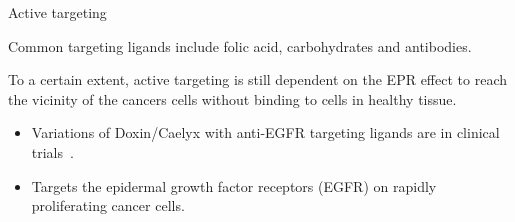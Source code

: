 \documentclass[final]{beamer}
\begin{document}
\begin{frame}[plain]
\begin{columns}[t,onlytextwidth]
\begin{block}{Active targeting\strut}
        Common targeting ligands include \alert{folic acid}, \alert{carbohydrates} and \alert{antibodies}.

        To a certain extent, active targeting is still dependent on the \alert{EPR effect} to reach the vicinity of the cancers cells without binding to cells in healthy tissue.

        \vspace{4ex}
        \begin{example}
          \begin{itemize}
            \item Variations of \alert{Doxin\textsuperscript{\textregistered}/Caelyx\textsuperscript{\textregistered}} with anti-EGFR targeting ligands are in clinical trials~\cite{mamot2012tolerability}.

            \item Targets the epidermal growth factor receptors (EGFR) on rapidly proliferating cancer cells.

          \end{itemize}
        \end{example}
      \end{block}

  \end{columns}

  \vfill
  \begin{multicols}{3}
    \printbibliography
  \end{multicols}
\end{frame}
\end{document}
